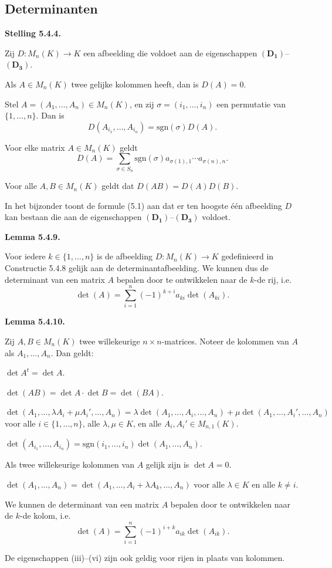 \documentclass[10pt,a4paper]{article}
\newenvironment{res}[2]{%
  \par\noindent\textbf{#1 #2.}%
}{%
  \par\vspace{2pt}\normalfont
}
\renewcommand{\vec}[1]{\mathbf{#1}}
\begin{document}
\subsection{Determinanten}
\begin{res}{Stelling}{5.4.4}
Zij $D:M_n(K)\to K$ een afbeelding die voldoet aan de eigenschappen $(\vec{D_1})$--$(\vec{D_3})$.
\begin{myenum}
\item Als $A\in M_n(K)$ twee gelijke kolommen heeft, dan is $D(A)=0$.
\item Stel $A=(A_1,\dots,A_n)\in M_n(K)$, en zij $\sigma=(i_1,\dots,i_n)$ een permutatie van $\{1,\dots,n\}$. Dan is
\[
D(A_{i_1},\dots,A_{i_n})=\mathrm{sgn}(\sigma)D(A).
\]
\item Voor elke matrix $A\in M_n(K)$ geldt
\[
D(A)=\sum_{\sigma\in S_n}\mathrm{sgn}(\sigma)a_{\sigma(1),1}\cdots a_{\sigma(n),n}. \tag{5.1}
\]
\item Voor alle $A,B\in M_n(K)$ geldt dat $D(AB)=D(A)D(B)$.
\end{myenum}
In het bijzonder toont de formule (5.1) aan dat er ten hoogste \'e\'en afbeelding $D$ kan bestaan die aan de eigenschappen $(\vec{D_1})$--$(\vec{D_3})$ voldoet.
\end{res}

\begin{res}{Lemma}{5.4.9}
Voor iedere $k\in\{1,\dots,n\}$ is de afbeelding $D:M_n(K)\to K$ gedefinieerd in Constructie 5.4.8 gelijk aan de determinantafbeelding. We kunnen dus de determinant van een matrix $A$ bepalen door te ontwikkelen naar de $k$-de rij, i.e.
\[
\det(A)=\sum_{i=1}^n (-1)^{k+i}a_{ki}\det(A_{ki}).
\]
\end{res}

\begin{res}{Lemma}{5.4.10}
Zij $A,B\in M_n(K)$ twee willekeurige $n\times n$-matrices. Noteer de kolommen van $A$ als $A_1,\dots,A_n$. Dan geldt:
\begin{myenum}
\item $\det A^t=\det A$.
\item $\det(AB)=\det A\cdot\det B=\det(BA)$.
\item $\det(A_1,\dots,\lambda A_i+\mu A_i',\dots,A_n)=\lambda\det(A_1,\dots,A_i,\dots,A_n)+\mu\det(A_1,\dots,A_i',\dots,A_n)$ voor alle $i\in\{1,\dots,n\}$, alle $\lambda,\mu\in K$, en alle $A_i,A_i'\in M_{n,1}(K)$.
\item $\det(A_{i_1},\dots,A_{i_n})=\mathrm{sgn}(i_1,\dots,i_n)\det(A_1,\dots,A_n)$.
\item Als twee willekeurige kolommen van $A$ gelijk zijn is $\det A=0$.
\item $\det(A_1,\dots,A_n)=\det(A_1,\dots,A_i+\lambda A_k,\dots,A_n)$ voor alle $\lambda\in K$ en alle $k\ne i$.
\item We kunnen de determinant van een matrix $A$ bepalen door te ontwikkelen naar de $k$-de kolom, i.e.
\[
\det(A)=\sum_{i=1}^n(-1)^{i+k}a_{ik}\det(A_{ik}).
\]
\end{myenum}
De eigenschappen (iii)--(vi) zijn ook geldig voor rijen in plaats van kolommen.
\end{res}
\end{document}
